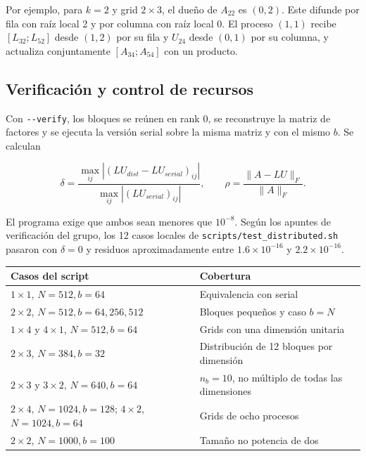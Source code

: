\documentclass[
  spanish,
  11pt,
  a4paper,
]{article}
\newcounter{none} %
\begin{document}
Por ejemplo, para \(k=2\) y grid \(2\times3\), el dueño de \(A_{22}\) es
\((0,2)\). Este difunde por fila con raíz local 2 y por columna con raíz
local 0. El proceso \((1,1)\) recibe \([L_{32};L_{52}]\) desde \((1,2)\)
por su fila y \(U_{24}\) desde \((0,1)\) por su columna, y actualiza
conjuntamente \([A_{34};A_{54}]\) con un producto.

\subsection{Verificación y control de
recursos}\label{verificaciuxf3n-y-control-de-recursos}

Con \texttt{-\/-verify}, los bloques se reúnen en rank 0, se reconstruye
la matriz de factores y se ejecuta la versión serial sobre la misma
matriz y con el mismo \(b\). Se calculan

\[\delta=\frac{\max_{ij}|(LU_{dist}-LU_{serial})_{ij}|}{\max_{ij}|(LU_{serial})_{ij}|},\qquad
\rho=\frac{\|A-LU\|_F}{\|A\|_F}.\]

El programa exige que ambos sean menores que \(10^{-8}\). Según los
apuntes de verificación del grupo, los 12 casos locales de
\texttt{scripts/test\_distributed.sh} pasaron con \(\delta=0\) y
residuos aproximadamente entre \(1.6\times10^{-16}\) y
\(2.2\times10^{-16}\).

{\def\LTcaptype{none} %
\begin{longtable}[]{@{}
  >{\raggedright\arraybackslash}p{}
  >{\raggedright\arraybackslash}p{}@{}}
\toprule\noalign{}
\begin{minipage}[b]{\linewidth}\raggedright
Casos del script
\end{minipage} & \begin{minipage}[b]{\linewidth}\raggedright
Cobertura
\end{minipage} \\
\midrule\noalign{}
\endhead
\bottomrule\noalign{}
\endlastfoot
\(1\times1\), \(N=512,b=64\) & Equivalencia con serial \\
\(2\times2\), \(N=512,b=64,256,512\) & Bloques pequeños y caso
\(b=N\) \\
\(1\times4\) y \(4\times1\), \(N=512,b=64\) & Grids con una dimensión
unitaria \\
\(2\times3\), \(N=384,b=32\) & Distribución de 12 bloques por
dimensión \\
\(2\times3\) y \(3\times2\), \(N=640,b=64\) & \(n_b=10\), no múltiplo de
todas las dimensiones \\
\(2\times4\), \(N=1024,b=128\); \(4\times2\), \(N=1024,b=64\) & Grids de
ocho procesos \\
\(2\times2\), \(N=1000,b=100\) & Tamaño no potencia de dos \\
\end{longtable}
}
\end{document}
